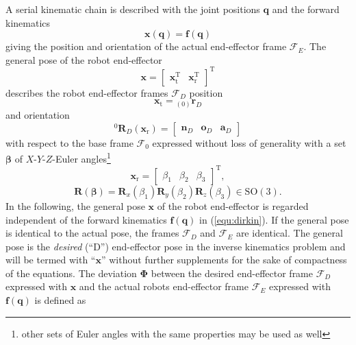 \documentclass[twocolumn,10pt]{IFTOMM}
\newcommand{\bm}[1]{\boldsymbol{#1}}
\newcommand{\ortvek}[4]{{ }_{(#1)}{\boldsymbol{#2}}^{#3}_{#4} }
\newcommand{\vek}[3]{\boldsymbol{#1}^{#2}_{#3}}
\newcommand{\rotmat}[2]{{{ }^{#1}\boldsymbol{R}}_{#2}}
\newcommand{\transp}[0]{{\mathrm{T}}}
\newcommand{\ks}[1]{{\mathcal{F}}_{#1}}
\begin{document}
A serial kinematic chain is described with the joint positions $\bm{q}$ and the forward kinematics
%
\begin{equation}
\bm{x} (\bm{q})
=
\bm{f} (\bm{q})
\label{equ:dirkin}
\end{equation}
%
giving the position and orientation of the actual end-effector frame $\ks{E}$.
The general pose of the robot end-effector
%
\begin{equation}
\bm{x}
=
\begin{bmatrix}
\bm{x}_{\mathrm{t}}^\transp & \bm{x}_{\mathrm{r}}^\transp
\end{bmatrix}^\transp
\label{equ:x_def}
\end{equation}
%
describes the robot end-effector frames $\ks{D}$ position 
%
\begin{equation}
\bm{x}_{\mathrm{t}}
=
\ortvek{0}{r}{}{D}
\label{equ:xt_def}
\end{equation}  
%
and orientation 
%
\begin{equation}
\rotmat{0}{D} (\bm{x}_{\mathrm{r}})
=
\begin{bmatrix}\vek{n}{}{D} & \vek{o}{}{D} & \vek{a}{}{D}\end{bmatrix}
\label{equ:xr_def_rotmat}
\end{equation}  
% 
with respect to the base frame $\ks{0}$ expressed without loss of generality with a set $\bm{\beta}$ of $X$-$Y$-$Z$-Euler angles\footnote{other sets of Euler angles with the same properties may be used as well}
%
\begin{equation}
\bm{x}_{\mathrm{r}}
=
\begin{bmatrix}
\beta_1  & \beta_2 & \beta_3
\end{bmatrix}^{\mathrm{T}},
\label{equ:xr_def}
\end{equation} 
%
\begin{equation}
\bm{R}(\bm{\beta}) = \bm{R}_x(\beta_1) \bm{R}_y(\beta_2) \bm{R}_z(\beta_3) \in \mathrm{SO(3)}.
\label{equ:def_rmat_xyz}
\end{equation}
%
In the following, the general pose $\bm{x}$ of the robot end-effector is regarded independent of the forward kinematics $\bm{f}(\bm{q})$ in (\ref{equ:dirkin}).
If the general pose is identical to the actual pose, the frames $\ks{D}$ and $\ks{E}$ are identical.
The general pose is the \emph{desired} (``D'') end-effector pose in the inverse kinematics problem and will be termed with ``$\bm{x}$'' without further supplements for the sake of compactness of the equations.
The deviation $\bm{\Phi}$ between the desired end-effector frame $\ks{D}$ expressed with $\bm{x}$ and the actual robots end-effector frame $\ks{E}$ expressed with $\bm{f}(\bm{q})$ is defined as
\end{document}
